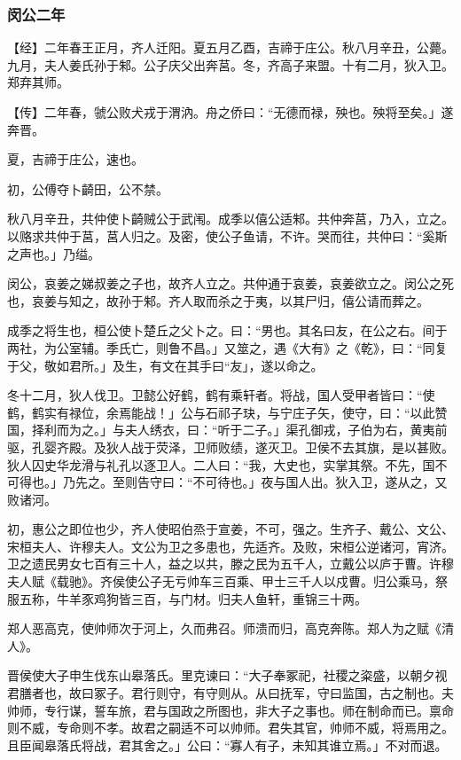 \documentclass[]{article}
\begin{document}
\hypertarget{header-n626}{%
\subsubsection{闵公二年}\label{header-n626}}

【经】二年春王正月，齐人迁阳。夏五月乙酉，吉禘于庄公。秋八月辛丑，公薨。九月，夫人姜氏孙于邾。公子庆父出奔莒。冬，齐高子来盟。十有二月，狄入卫。郑弃其师。

【传】二年春，虢公败犬戎于渭汭。舟之侨曰：``无德而禄，殃也。殃将至矣。」遂奔晋。

夏，吉禘于庄公，速也。

初，公傅夺卜齮田，公不禁。

秋八月辛丑，共仲使卜齮贼公于武闱。成季以僖公适邾。共仲奔莒，乃入，立之。以赂求共仲于莒，莒人归之。及密，使公子鱼请，不许。哭而往，共仲曰：``奚斯之声也。」乃缢。

闵公，哀姜之娣叔姜之子也，故齐人立之。共仲通于哀姜，哀姜欲立之。闵公之死也，哀姜与知之，故孙于邾。齐人取而杀之于夷，以其尸归，僖公请而葬之。

成季之将生也，桓公使卜楚丘之父卜之。曰：``男也。其名曰友，在公之右。间于两社，为公室辅。季氏亡，则鲁不昌。」又筮之，遇《大有》之《乾》，曰：``同复于父，敬如君所。」及生，有文在其手曰``友」，遂以命之。

冬十二月，狄人伐卫。卫懿公好鹤，鹤有乘轩者。将战，国人受甲者皆曰：``使鹤，鹤实有禄位，余焉能战！」公与石祁子玦，与宁庄子矢，使守，曰：``以此赞国，择利而为之。」与夫人绣衣，曰：``听于二子。」渠孔御戎，子伯为右，黄夷前驱，孔婴齐殿。及狄人战于荧泽，卫师败绩，遂灭卫。卫侯不去其旗，是以甚败。狄人囚史华龙滑与礼孔以逐卫人。二人曰：``我，大史也，实掌其祭。不先，国不可得也。」乃先之。至则告守曰：``不可待也。」夜与国人出。狄入卫，遂从之，又败诸河。

初，惠公之即位也少，齐人使昭伯烝于宣姜，不可，强之。生齐子、戴公、文公、宋桓夫人、许穆夫人。文公为卫之多患也，先适齐。及败，宋桓公逆诸河，宵济。卫之遗民男女七百有三十人，益之以共，滕之民为五千人，立戴公以庐于曹。许穆夫人赋《载驰》。齐侯使公子无亏帅车三百乘、甲士三千人以戍曹。归公乘马，祭服五称，牛羊豕鸡狗皆三百，与门材。归夫人鱼轩，重锦三十两。

郑人恶高克，使帅师次于河上，久而弗召。师溃而归，高克奔陈。郑人为之赋《清人》。

晋侯使大子申生伐东山皋落氏。里克谏曰：``大子奉冢祀，社稷之粢盛，以朝夕视君膳者也，故曰冢子。君行则守，有守则从。从曰抚军，守曰监国，古之制也。夫帅师，专行谋，誓车旅，君与国政之所图也，非大子之事也。师在制命而已。禀命则不威，专命则不孝。故君之嗣适不可以帅师。君失其官，帅师不威，将焉用之。且臣闻皋落氏将战，君其舍之。」公曰：``寡人有子，未知其谁立焉。」不对而退。
\end{document}
